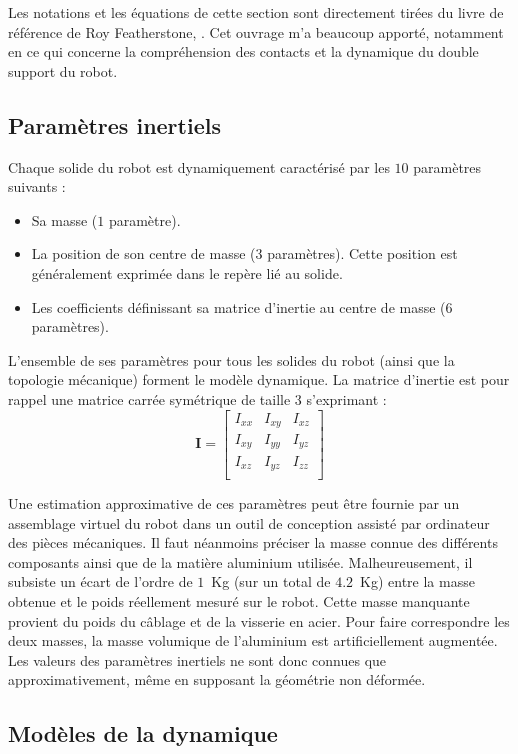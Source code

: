 Les notations et les équations de cette section sont
directement tirées du livre de référence de
Roy Featherstone, \cite{featherstone_rigid_2008}.
Cet ouvrage m'a beaucoup apporté, notamment en ce qui concerne
la compréhension des contacts et la dynamique 
du double support du robot.

\subsection{Paramètres inertiels}

Chaque solide du robot est dynamiquement caractérisé 
par les $10$ paramètres suivants :
\begin{itemize}
    \item Sa masse ($1$ paramètre).
    \item La position de son centre de masse ($3$ paramètres).
        Cette position est généralement exprimée dans le repère lié au solide.
    \item Les coefficients définissant sa matrice d'inertie 
        au centre de masse ($6$ paramètres).
\end{itemize}
L'ensemble de ses paramètres pour tous les solides du robot 
(ainsi que la topologie mécanique) forment le modèle dynamique.
La matrice d'inertie est pour rappel une matrice carrée symétrique de taille $3$
s'exprimant :
$$
\bm{I} =
\begin{bmatrix}
    I_{xx} & I_{xy} & I_{xz} \\
    I_{xy} & I_{yy} & I_{yz} \\
    I_{xz} & I_{yz} & I_{zz} \\
\end{bmatrix}
$$

Une estimation approximative de ces paramètres peut être fournie par 
un assemblage virtuel du robot dans un outil de conception assisté 
par ordinateur des pièces mécaniques.
Il faut néanmoins préciser la masse connue des différents composants
ainsi que de la matière aluminium utilisée.
Malheureusement, il subsiste un écart de l'ordre de $1$~Kg (sur un total
de $4.2$~Kg) entre la 
masse obtenue et le poids réellement mesuré sur le robot.
Cette \og masse manquante \fg provient du poids du câblage et
de la visserie en acier.
Pour faire correspondre les deux masses, la masse volumique
de l'aluminium est artificiellement augmentée.
Les valeurs des paramètres inertiels ne sont donc connues
que approximativement, même en supposant la géométrie non déformée.

\subsection{Modèles de la dynamique\label{sec:dynamics_models}}

